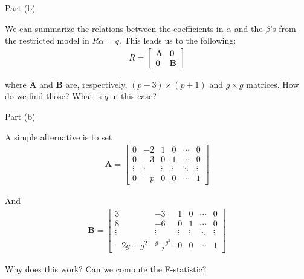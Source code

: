 \begin{frame}{Part (b)}

    We can summarize the relations between the coefficients in $\alpha$ and the $\beta$'s from the restricted model in $R \alpha = q$. This leads us to the following:
    \begin{align*}
        R = \begin{bmatrix}
            \mathbf{A} & \mathbf{0} \\
            \mathbf{0} & \mathbf{B}
        \end{bmatrix}
    \end{align*}
    
    where $\mathbf{A}$ and $\mathbf{B}$ are, respectively, $(p - 3) \times (p + 1)$ and $g \times g$ matrices. How do we find those? What is $q$ in this case?
    
\end{frame}

\begin{frame}{Part (b)}

    A simple alternative is to set
    \begin{align*}
        \mathbf{A} = \begin{bmatrix}
                        0 & -2 & 1 & 0 & \cdots & 0 \\
                        0 & -3 & 0 & 1 & \cdots & 0 \\
                        \vdots & \vdots & \vdots & \vdots &\ddots & \vdots\\
                        0 & -p & 0 & 0 & \cdots &  1
                    \end{bmatrix}
    \end{align*}

    And
    \begin{align*}
        \mathbf{B} = \begin{bmatrix}
                    3 & -3 & 1 & 0 & \cdots & 0 \\
                    8 & -6 & 0 & 1 & \cdots & 0 \\
                    \vdots & \vdots & \vdots & \vdots & \ddots & \vdots \\
                    -2g + g^2 & \frac{g - g^2}{2} & 0 & 0 & \cdots & 1
                    \end{bmatrix}
    \end{align*}

    Why does this work? Can we compute the F-statistic?
    
\end{frame}

